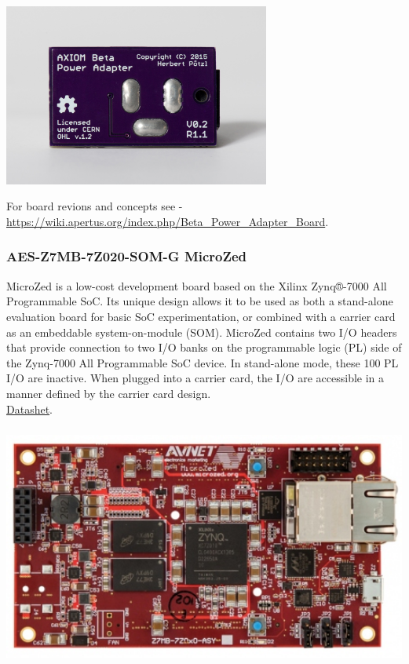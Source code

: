 \begin{center}
\includegraphics[height=6cm]{images/Power-adapter-01}
\end{center}

For board revions and concepts see - \href{https://wiki.apertus.org/index.php/Beta_Power_Adapter_Board}{https://wiki.apertus.org/index.php/Beta\_Power\_Adapter\_Board}.\\







\subsubsection{AES-Z7MB-7Z020-SOM-G MicroZed}

MicroZed is a low-cost development board based on the Xilinx Zynq®-7000 All Programmable SoC. Its unique design allows it to be used as both a stand-alone evaluation board for basic SoC experimentation, or combined with a carrier card as an embeddable system-on-module (SOM). MicroZed contains two I/O headers that provide connection to two I/O banks on the programmable logic (PL) side of the Zynq-7000 All Programmable SoC device. In stand-alone mode, these 100 PL I/O are inactive. When plugged into a carrier card, the I/O are accessible in a manner defined by the carrier card design.\\

\href{https://wiki.apertus.org/index.php/File:AES-Z7MB-7Z020-SOM-G_MicroZed_Datasheet.pdf}{Datashet}.\\


\begin{center}
\includegraphics[height=8cm]{images/MicroZed}
\end{center}


